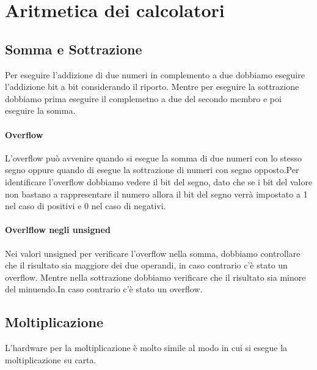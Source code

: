 \section{Aritmetica dei calcolatori}

\subsection{Somma e Sottrazione}
Per eseguire l'addizione di due numeri in complemento 
a due dobbiamo eseguire l'addizione bit a bit considerando il riporto.
Mentre per eseguire la sottrazione dobbiamo prima eseguire il complemetno 
a due del secondo membro e poi eseguire la somma.
\paragraph{Overflow}
L'overflow può avvenire quando si esegue la somma di due 
numeri con lo stesso segno oppure quando di esegue la sottrazione di 
numeri con segno opposto.Per identificare l'overflow dobbiamo vedere il 
bit del segno, dato che se i bit del valore non bastano a rappresentare il numero
allora il bit del segno verrà impostato a 1 nel caso di positivi e 0 nel caso di negativi.

\paragraph{Overlflow negli unsigned}
Nei valori unsigned per verificare l'overflow nella somma,
dobbiamo controllare che il risultato sia maggiore dei due
operandi, in caso contrario c'è stato un overflow.
Mentre nella sottrazione dobbiamo verificare che il 
risultato sia minore del minuendo.In caso contrario c'è stato un overflow.

\subsection{Moltiplicazione}

L'hardware per la moltiplicazione è molto simile al modo in cui si esegue la moltiplicazione su carta.

